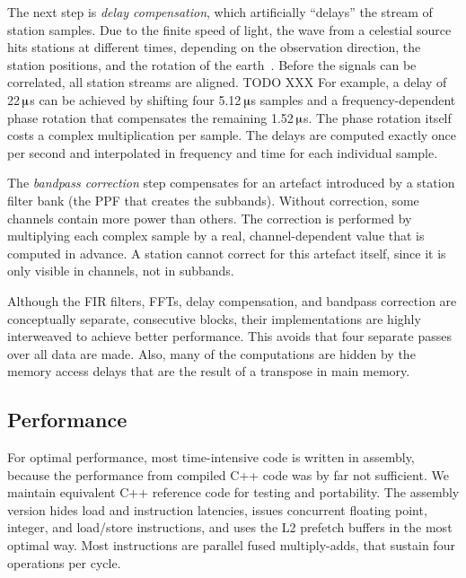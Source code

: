 \documentclass[conference]{IEEEtran}
\newcommand{\us}{\,$\muup$s\xspace}
\begin{document}
The next step is \emph{delay compensation}, which artificially ``delays'' the stream of station samples.
Due to the finite speed of light, the wave from a celestial source hits
stations at different times, depending on the observation direction, the
station positions, and the rotation of the earth~\cite[Sec.~2.1]{Romein:06}.
Before the signals can be correlated, all station streams are aligned.
TODO XXX
For example, a delay of 22\us can be achieved by shifting four 5.12\us
samples and a frequency-dependent phase rotation that compensates the
remaining 1.52\us.
The phase rotation itself costs a complex multiplication per sample.
The delays are computed exactly once per second and interpolated in frequency
and time for each individual sample.

The \emph{bandpass correction} step compensates for an artefact
introduced by a station filter bank (the PPF that creates the subbands).
Without correction, some channels contain more power than others.
The correction is performed by multiplying each complex sample by a real,
channel-dependent value that is computed in advance.
A station cannot correct for this artefact itself, since it is only visible
in channels, not in subbands.

Although the FIR filters, FFTs, delay compensation, and bandpass correction
are conceptually separate, consecutive blocks, their implementations are
highly interweaved to achieve better performance.
This avoids that four separate passes over all data are made.
Also, many of the computations are hidden by the memory access delays that
are the result of a transpose in main memory.



\subsection{Performance}

For optimal performance, most time-intensive code is written in assembly,
because the performance from compiled C++ code was by far not sufficient.
We maintain equivalent C++ reference code for testing and portability.
The assembly version hides load and instruction latencies, issues concurrent
floating point, integer, and load/store instructions,
and uses the L2 prefetch buffers in the most optimal way.
Most instructions are parallel fused multiply-adds, that sustain four
operations per cycle.



\end{document}
